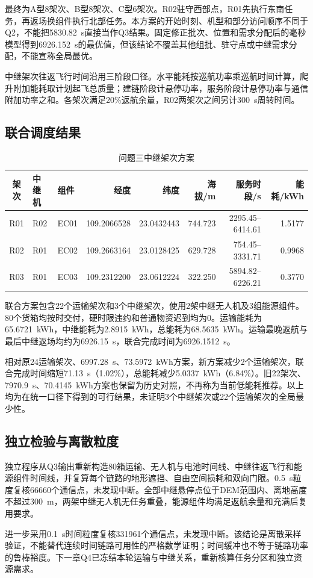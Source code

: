最终为A型8架次、B型8架次、C型6架次。R02驻守西部点，R01先执行东南任务，再返场换组件执行北部任务。本方案的开始时刻、机型和部分访问顺序不同于Q2，不能把5830.82~s直接当作Q3结果。固定修正批次、位置和需求分配后的毫秒模型得到6926.152~s的最优值，但该结论不覆盖其他组批、驻守点或中继需求分配，不能宣称全局最优。

中继架次往返飞行时间沿用三阶段口径。水平能耗按巡航功率乘巡航时间计算，爬升附加能耗取计划起飞总质量；建链阶段计悬停功率，服务阶段计悬停功率与通信附加功率之和。各架次满足20\%返航余量，R02两架次之间另计300~s周转时间。

\subsection{联合调度结果}

\begin{table}[htbp]
\centering
\caption{问题三中继架次方案}
\small
\begin{tabular}{cllrrrrr}
\toprule
架次 & 中继机 & 组件 & 经度 & 纬度 & 海拔/m & 服务时段/s & 能耗/kWh\\
\midrule
R01 & R02 & EC01 & 109.2066528 & 23.0432443 & 744.723 & 2295.45--6414.61 & 1.5177\\
R02 & R01 & EC02 & 109.2663164 & 23.0128425 & 629.728 & 754.45--3331.71 & 0.9968\\
R03 & R01 & EC03 & 109.2312200 & 23.0612224 & 322.250 & 5894.82--6226.21 & 0.3770\\
\bottomrule
\end{tabular}
\end{table}

联合方案包含22个运输架次和3个中继架次，使用2架中继无人机及3组能源组件。80个货箱均按时交付，硬时限违约和普通物资迟到均为0。运输能耗为65.6721~kWh，中继能耗为2.8915~kWh，总能耗为68.5635~kWh。运输最晚返航与最后中继返场均约为6926.15~s，联合完成时间为6926.1512~s。

相对原24运输架次、6997.28~s、73.5972~kWh方案，新方案减少2个运输架次，联合完成时间缩短71.13~s（1.02\%），总能耗减少5.0337~kWh（6.84\%）。旧22架次、7970.9~s、70.4145~kWh方案也保留为历史对照，不再称为当前低能耗推荐。以上均为在统一口径下得到的可行结果，未证明3个中继架次或22个运输架次的全局最少性。

\subsection{独立检验与离散粒度}

独立程序从Q3输出重新构造80箱运输、无人机与电池时间线、中继往返飞行和能源组件时间线，并复算每个链路的地形遮挡、自由空间损耗和双向门限。0.5~s粒度复核66660个通信点，未发现中断。全部中继悬停点位于DEM范围内、离地高度不超过300~m，两架中继无人机无任务重叠，能源组件均满足返航余量和充满后复用要求。

进一步采用0.1~s时间粒度复核331961个通信点，未发现中断。该结论是离散采样验证，不能替代连续时间链路可用性的严格数学证明；时间缓冲也不等于链路功率的鲁棒裕度。下一章Q4已冻结本轮运输与中继关系，重新核算任务分区和独立资源需求。
